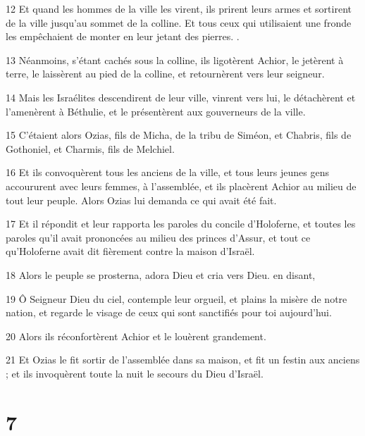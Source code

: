 \par 12 Et quand les hommes de la ville les virent, ils prirent leurs armes et sortirent de la ville jusqu'au sommet de la colline. Et tous ceux qui utilisaient une fronde les empêchaient de monter en leur jetant des pierres. .
\par 13 Néanmoins, s'étant cachés sous la colline, ils ligotèrent Achior, le jetèrent à terre, le laissèrent au pied de la colline, et retournèrent vers leur seigneur.
\par 14 Mais les Israélites descendirent de leur ville, vinrent vers lui, le détachèrent et l'amenèrent à Béthulie, et le présentèrent aux gouverneurs de la ville.
\par 15 C'étaient alors Ozias, fils de Micha, de la tribu de Siméon, et Chabris, fils de Gothoniel, et Charmis, fils de Melchiel.
\par 16 Et ils convoquèrent tous les anciens de la ville, et tous leurs jeunes gens accoururent avec leurs femmes, à l'assemblée, et ils placèrent Achior au milieu de tout leur peuple. Alors Ozias lui demanda ce qui avait été fait.
\par 17 Et il répondit et leur rapporta les paroles du concile d'Holoferne, et toutes les paroles qu'il avait prononcées au milieu des princes d'Assur, et tout ce qu'Holoferne avait dit fièrement contre la maison d'Israël.
\par 18 Alors le peuple se prosterna, adora Dieu et cria vers Dieu. en disant,
\par 19 Ô Seigneur Dieu du ciel, contemple leur orgueil, et plains la misère de notre nation, et regarde le visage de ceux qui sont sanctifiés pour toi aujourd'hui.
\par 20 Alors ils réconfortèrent Achior et le louèrent grandement.
\par 21 Et Ozias le fit sortir de l'assemblée dans sa maison, et fit un festin aux anciens ; et ils invoquèrent toute la nuit le secours du Dieu d'Israël.

\chapter{7}

